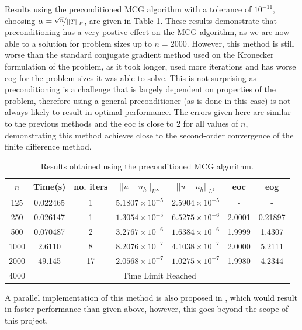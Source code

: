\documentclass[11pt]{article}
\numberwithin{equation}{section}
\begin{document}
Results using the preconditioned MCG algorithm with a tolerance of $10^{-11}$, choosing $\alpha = \nicefrac{\sqrt{n}}{||T||_F}$, are given in Table \ref{table:pre MCG}. These results demonstrate that preconditioning has a very postive effect on the MCG algorithm, as we are now able to a solution for problem sizes up to $n=2000$. However, this method is still worse than the standard conjugate gradient method used on the Kronecker formulation of the problem, as it took longer, used more iterations and has worse eog for the problem sizes it was able to solve. This is not surprising as preconditioning is a challenge that is largely dependent on properties of the problem, therefore using a general preconditioner (as is done in this case) is not always likely to result in optimal performance. The errors given here are similar to the previous methods and the eoc is close to 2 for all values of $n$, demonstrating this method achieves close to the second-order convergence of the finite difference method.

\begin{table}[H]
\centering
\begin{tabular}{|c|c|c|c|c|c|c|}
\hline
$n$ & Time(s) & no. iters & $|| u - u_h ||_{L^{\infty}}$ &$|| u - u_h ||_{L^{2}}$ & eoc & eog \\
\hline
125 & 0.022465 & 1 & $5.1807 \times 10^{-5}$ & $2.5904 \times 10^{-5}$ & - & - \\
250 & 0.026147 & 1 & $1.3054 \times 10^{-5}$ & $6.5275 \times 10^{-6}$ & 2.0001 & 0.21897 \\
500 & 0.070487 & 2 & $3.2767 \times 10^{-6}$ & $1.6384 \times 10^{-6}$ & 1.9999 & 1.4307 \\
1000 & 2.6110 & 8 & $8.2076 \times 10^{-7}$ & $4.1038 \times 10^{-7}$ & 2.0000 & 5.2111 \\
2000 & 49.145 & 17 & $2.0568 \times 10^{-7}$ & $1.0275 \times 10^{-7}$ & 1.9980 & 4.2344 \\
\cline{2-7}
4000 & \multicolumn{6}{c|}{Time Limit Reached} \\
\hline
\end{tabular}
\captionsetup{justification=centering}
\caption{Results obtained using the preconditioned MCG algorithm.}
\label{table:pre MCG}
\end{table}

A parallel implementation of this method is also proposed in \cite{Hou}, which would result in faster performance than given above, however, this goes beyond the scope of this project.
\end{document}
